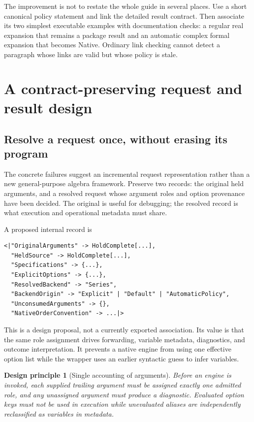 \documentclass[11pt]{article}
\newtheorem{principle}[proposition]{Design principle}
\begin{document}
The improvement is not to restate the whole guide in several places. Use a short canonical policy statement and link the detailed result contract. Then associate its two simplest executable examples with documentation checks: a regular real expansion that remains a package result and an automatic complex formal expansion that becomes Native. Ordinary link checking cannot detect a paragraph whose links are valid but whose policy is stale.

\section{A contract-preserving request and result design}

\subsection{Resolve a request once, without erasing its program}
The concrete failures suggest an incremental request representation rather than a new general-purpose algebra framework. Preserve two records: the original held arguments, and a resolved request whose argument roles and option provenance have been decided. The original is useful for debugging; the resolved record is what execution and operational metadata must share.

A proposed internal record is
\begin{lstlisting}
<|"OriginalArguments" -> HoldComplete[...],
  "HeldSource" -> HoldComplete[...],
  "Specifications" -> {...},
  "ExplicitOptions" -> {...},
  "ResolvedBackend" -> "Series",
  "BackendOrigin" -> "Explicit" | "Default" | "AutomaticPolicy",
  "UnconsumedArguments" -> {},
  "NativeOrderConvention" -> ...|>
\end{lstlisting}
This is a design proposal, not a currently exported association. Its value is that the same role assignment drives forwarding, variable metadata, diagnostics, and outcome interpretation. It prevents a native engine from using one effective option list while the wrapper uses an earlier syntactic guess to infer variables.

\begin{principle}[Single accounting of arguments]
Before an engine is invoked, each supplied trailing argument must be assigned exactly one admitted role, and any unassigned argument must produce a diagnostic. Evaluated option keys must not be used in execution while unevaluated aliases are independently reclassified as variables in metadata.
\end{principle}
\end{document}
